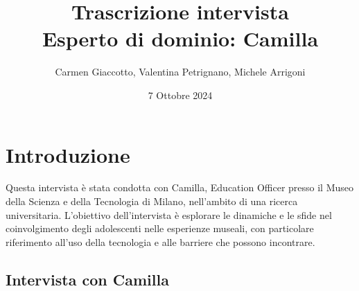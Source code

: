 \documentclass{article}
\title{\textbf{Trascrizione intervista}\\ Esperto di dominio: Camilla}
\author{Carmen Giaccotto, Valentina Petrignano, Michele Arrigoni  }
\date{7 Ottobre 2024}
\begin{document}
\maketitle

\section{Introduzione}
Questa intervista è stata condotta con Camilla, Education Officer presso il Museo della Scienza e della Tecnologia di Milano, nell'ambito di una ricerca universitaria. L'obiettivo dell'intervista è esplorare le dinamiche e le sfide nel coinvolgimento degli adolescenti nelle esperienze museali, con particolare riferimento all'uso della tecnologia e alle barriere che possono incontrare.

\subsection{\textcolor{subsectioncolor}{Intervista con Camilla}}
\end{document}
